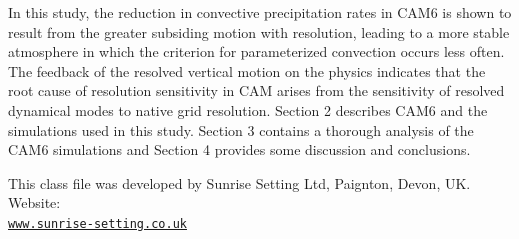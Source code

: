 \documentclass[times]{qjrms4}
\begin{document}
In this study, the reduction in convective precipitation rates in CAM6 is shown to result from the greater subsiding motion with resolution, leading to a more stable atmosphere in which the criterion for parameterized convection occurs less often. The feedback of the resolved vertical motion on the physics indicates that the root cause of resolution sensitivity in CAM arises from the sensitivity of resolved dynamical modes to native grid resolution. Section 2 describes CAM6 and the simulations used in this study. Section 3 contains a thorough analysis of the CAM6 simulations and Section 4 provides some discussion and conclusions.

%

\ack This class file was developed by Sunrise Setting Ltd,
Paignton, Devon, UK. Website:\\
\href{http://www.sunrise-setting.co.uk}{\texttt{www.sunrise-setting.co.uk}}



\end{document}
